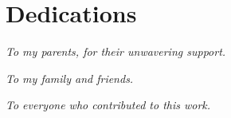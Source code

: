 
\chapter*{Dedications}

\vspace{2cm}

\begin{flushright}
	\textit{To my parents, for their unwavering support.}

	\vspace{1cm}

	\textit{To my family and friends.}

	\vspace{1cm}

	\textit{To everyone who contributed to this work.}
\end{flushright}
